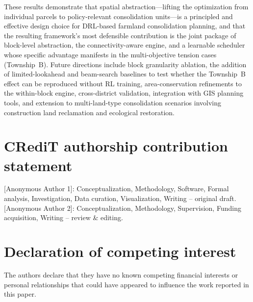 \documentclass[preprint,12pt]{elsarticle}
\begin{document}
These results demonstrate that spatial abstraction---lifting the optimization from individual parcels to policy-relevant consolidation units---is a principled and effective design choice for DRL-based farmland consolidation planning, and that the resulting framework's most defensible contribution is the joint package of block-level abstraction, the connectivity-aware engine, and a learnable scheduler whose specific advantage manifests in the multi-objective tension cases (Township~B). Future directions include block granularity ablation, the addition of limited-lookahead and beam-search baselines to test whether the Township~B effect can be reproduced without RL training, area-conservation refinements to the within-block engine, cross-district validation, integration with GIS planning tools, and extension to multi-land-type consolidation scenarios involving construction land reclamation and ecological restoration.



\section*{CRediT authorship contribution statement}
[Anonymous Author 1]: Conceptualization, Methodology, Software, Formal analysis, Investigation, Data curation, Visualization, Writing -- original draft.
[Anonymous Author 2]: Conceptualization, Methodology, Supervision, Funding acquisition, Writing -- review \& editing.

\section*{Declaration of competing interest}
The authors declare that they have no known competing financial interests or personal relationships that could have appeared to influence the work reported in this paper.
\end{document}
